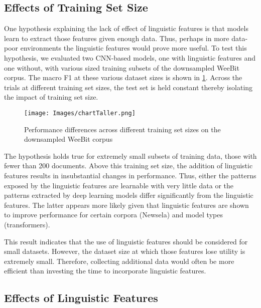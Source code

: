 \documentclass[11pt,a4paper]{article}
\theoremstyle{definition}
\begin{document}
\subsection{Effects of Training Set Size}
One hypothesis explaining the lack of effect of linguistic features is that models learn to extract those features given enough data. Thus, perhaps in more data-poor environments the linguistic features would prove more useful. To test this hypothesis, we evaluated two CNN-based models, one with linguistic features and one without, with various sized training subsets of the downsampled WeeBit corpus. The macro F1 at these various dataset sizes is shown in \cref{fig:subsampleWeeBit}. Across the trials at different training set sizes, the test set is held constant thereby isolating the impact of training set size.

\begin{figure}
    \centering
    \texttt{[image: Images/chartTaller.png]}
    \caption{Performance differences across different training set sizes on the downsampled WeeBit corpus}
    \label{fig:subsampleWeeBit}
\end{figure}

The hypothesis holds true for extremely small subsets of training data, those with fewer than 200 documents. Above this training set size, the addition of linguistic features results in insubstantial changes in performance. Thus, either the patterns exposed by the linguistic features are learnable with very little data or the patterns extracted by deep learning models differ significantly from the linguistic features. The latter appears more likely given that linguistic features are shown to improve performance for certain corpora (Newsela) and model types (transformers). 

This result indicates that the use of linguistic features should be considered for small datasets. However, the dataset size at which those features lose utility is extremely small. Therefore, collecting additional data would often be more efficient than investing the time to incorporate linguistic features.

\subsection{Effects of Linguistic Features}
\end{document}
